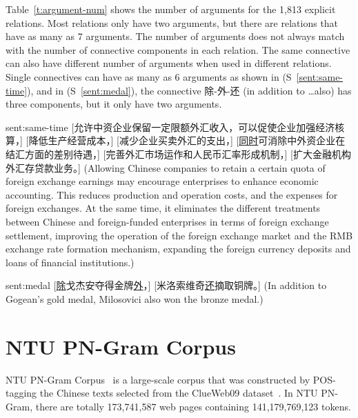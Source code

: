 

Table~\ref{t:argument-num} shows the number of arguments for the 1,813 explicit
relations. Most relations only have two arguments, but there are relations
that have as many as 7 arguments. The number of arguments does not always
match with the number of connective components in each relation. The same
connective can also have different number of arguments when used in
different relations. Single connectives can have as many as 6 arguments
as shown in (S~\ref{sent:same-time}), and in (S~\ref{sent:medal}),
the connective 除-外-还 (in addition to \ldots also)
has three components, but it only have two arguments.



\begin{sent}{sent:same-time}{}
    [允许中资企业保留一定限额外汇收入，可以促使企业加强经济核算，]
    [降低生产经营成本，]
    [减少企业买卖外汇的支出，]
    [\underline{同时}可消除中外资企业在结汇方面的差别待遇，]
    [完善外汇市场运作和人民币汇率形成机制，]
    [扩大金融机构外汇存贷款业务。]
    (Allowing Chinese companies to retain a certain quota of foreign exchange earnings
     may encourage enterprises to enhance economic accounting.
     This reduces production and operation costs, and the expenses for foreign
     exchanges.  At the same time, it eliminates the different treatments between
     Chinese and foreign-funded enterprises in terms of foreign exchange settlement,
     improving the operation of the foreign exchange market and the RMB
     exchange rate formation mechanism, expanding the foreign currency deposits and
     loans of financial institutions.)
\end{sent}

\begin{sent}{sent:medal}{}
    [\underline{除}戈杰安夺得金牌\underline{外}，]
    [米洛索维奇\underline{还}摘取铜牌。]
    (In addition to Gogean's gold medal, Milosovici also won the bronze medal.)
\end{sent}

\section{NTU PN-Gram Corpus}
\label{s:pn-corpus}

NTU PN-Gram Corpus~\citep{yu2012development} is a large-scale corpus that was
constructed by POS-tagging the Chinese texts selected from the ClueWeb09
dataset~\citep{callan2009clueweb09}. In NTU PN-Gram, there are totally 173,741,587
web pages containing 141,179,769,123 tokens.

